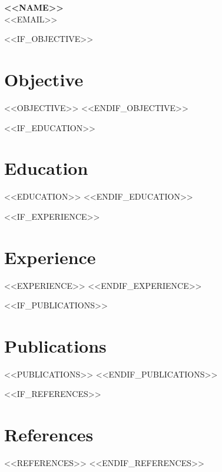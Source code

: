 \documentclass[11pt]{article}
\begin{document}
\begin{center}
{\LARGE\bfseries <<NAME>>}\\[0.5em]
{\normalsize <<EMAIL>>}
\end{center}
\vspace{1em}

<<IF_OBJECTIVE>>
\section{Objective}
<<OBJECTIVE>>
<<ENDIF_OBJECTIVE>>

<<IF_EDUCATION>>
\section{Education}
<<EDUCATION>>
<<ENDIF_EDUCATION>>

<<IF_EXPERIENCE>>
\section{Experience}
<<EXPERIENCE>>
<<ENDIF_EXPERIENCE>>

<<IF_PUBLICATIONS>>
\section{Publications}
<<PUBLICATIONS>>
<<ENDIF_PUBLICATIONS>>

<<IF_REFERENCES>>
\section{References}
<<REFERENCES>>
<<ENDIF_REFERENCES>>
\end{document}
